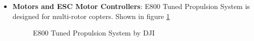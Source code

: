 \documentclass[12pt]{report}
\begin{document}
\begin{itemize}
\item \textbf{Motors and ESC Motor Controllers}: E800 Tuned Propulsion System is designed for multi-rotor copters. Shown in figure \ref{fig:dji_propulsion_system}

\begin{figure}[H]
\centering
	\caption{E800 Tuned Propulsion System by DJI}
   \label{fig:dji_propulsion_system}
\end{figure}

\end{itemize}
\end{document}
